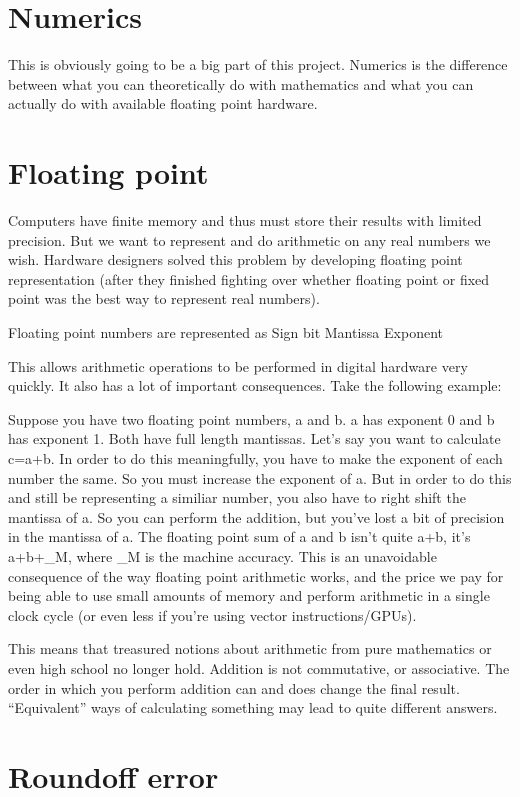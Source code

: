 \documentclass{amsart}
\begin{document}
\section{Numerics}
This is obviously going to be a big part of this project. Numerics is the
difference between what you can theoretically do with mathematics and what
you can actually do with available floating point hardware.

\section{Floating point}
Computers have finite memory and thus must store their results with limited
precision. But we want to represent and do arithmetic on any real numbers
we wish. Hardware designers solved this problem by developing floating point
representation (after they finished fighting over whether floating point or
fixed point was the best way to represent real numbers).

Floating point numbers are represented as
Sign bit
Mantissa
Exponent

This allows arithmetic operations to be performed in digital hardware very
quickly. It also has a lot of important consequences. Take the following
example:

Suppose you have two floating point numbers, a and b. a has exponent 0 and
b has exponent 1. Both have full length mantissas. Let's say you want to
calculate c=a+b. In order to do this meaningfully, you have to make the exponent
of each number the same. So you must increase the exponent of a. But in order
to do this and still be representing a similiar number, you also have to right
shift the mantissa of a. So you can perform the addition, but you've lost
a bit of precision in the mantissa of a. The floating point sum of a and b
isn't quite a+b, it's a+b+\epsilon_M, where \epsilon_M is the machine accuracy.
This is an unavoidable consequence of the way floating point arithmetic works,
and the price we pay for being able to use small amounts of memory and
perform arithmetic in a single clock cycle (or even less if you're using
vector instructions/GPUs).

This means that treasured notions about arithmetic from pure mathematics or
even high school no longer hold. Addition is not commutative, or associative.
The order in which you perform addition can and does change the final result.
``Equivalent'' ways of calculating something may lead to quite different
answers.

\section{Roundoff error}
\end{document}
